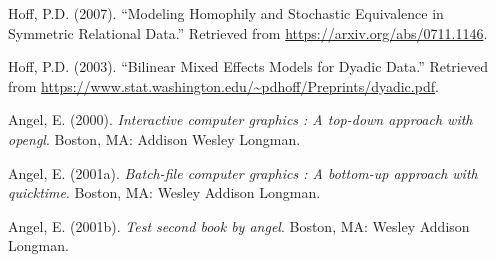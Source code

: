 \documentclass[12pt,twoside]{dukestatscithesis}
\theoremstyle{definition}
\theoremstyle{definition}
\theoremstyle{definition}
\theoremstyle{remark}
\begin{document}
Hoff, P.D. (2007). ``Modeling Homophily and Stochastic Equivalence in
Symmetric Relational Data.'' Retrieved from
\url{https://arxiv.org/abs/0711.1146}.

Hoff, P.D. (2003). ``Bilinear Mixed Effects Models for Dyadic Data.''
Retrieved from
\url{https://www.stat.washington.edu/~pdhoff/Preprints/dyadic.pdf}.


\noindent

\setlength{\parindent}{-0.20in} \setlength{\leftskip}{0.20in}
\setlength{\parskip}{8pt}

\hypertarget{refs}{}
\hypertarget{ref-angel2000}{}
Angel, E. (2000). \emph{Interactive computer graphics : A top-down
approach with opengl}. Boston, MA: Addison Wesley Longman.

\hypertarget{ref-angel2001}{}
Angel, E. (2001a). \emph{Batch-file computer graphics : A bottom-up
approach with quicktime}. Boston, MA: Wesley Addison Longman.

\hypertarget{ref-angel2002a}{}
Angel, E. (2001b). \emph{Test second book by angel}. Boston, MA: Wesley
Addison Longman.


\end{document}
